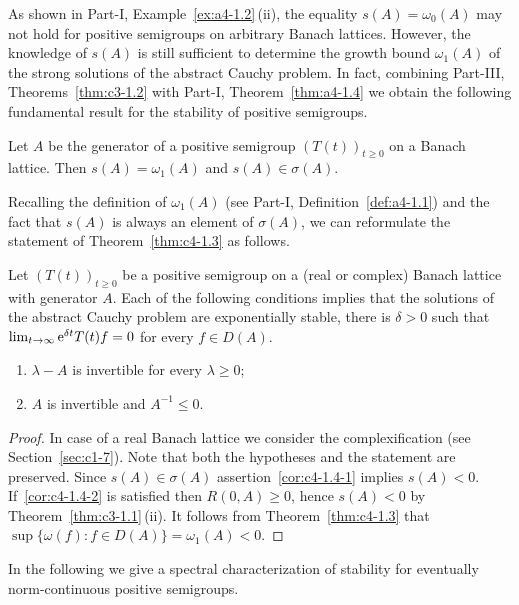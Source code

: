 As shown in Part-I, Example~\ref{ex:a4-1.2}\,(ii), the equality $s(A) = \omega_{0}(A)$ may not hold for positive semigroups on arbitrary Banach lattices.
However, the knowledge of\/ $s(A)$ is still sufficient to determine the growth bound $\omega_{1}(A)$ of the strong solutions of the abstract Cauchy problem.
In fact, combining 
Part-III, Theorems~\ref{thm:c3-1.2}  with 
Part-I, Theorem~\ref{thm:a4-1.4} 
we obtain the following fundamental result for the stability of positive semigroups.
\begin{theorem}\label{thm:c4-1.3}
Let $A$ be the generator of a positive semigroup $(T(t))_{t\geq 0}$ on a Banach lattice.
Then $s(A) = \omega_{1}(A)$ and $s(A) \in \sigma(A)$.
\end{theorem}
Recalling the definition of\/ $\omega_{1}(A)$ 
(see Part-I, Definition~\ref{def:a4-1.1}) 
and the fact that $s(A)$ is always an element of\/ $\sigma(A)$, we can reformulate the statement of Theorem~\ref{thm:c4-1.3} as follows.
\begin{corollary}\label{cor:c4-1.4}%
Let $(T(t))_{t\geq 0}$ be a positive semigroup on a (real or complex) Banach lattice with generator $A$.
Each of the following conditions implies that the solutions of the abstract Cauchy problem are exponentially stable, \ie  there is $\delta > 0$ such that $\lim_{t \to \infty} \mathrm{e}^{\delta t}T(t)f = 0$ for every $f \in D(A)$.
\begin{enumerate}[\upshape (i)]
    \item \label{cor:c4-1.4-1}
    $\lambda - A$ is invertible for every $\lambda \geq 0$;
    \item \label{cor:c4-1.4-2}
    $A$ is invertible and $A^{-1} \leq 0$.
    \end{enumerate}
\end{corollary}
\begin{proof}
In case of a real Banach lattice we consider the complexification 
(see Section~\ref{sec:c1-7}).
Note that both the hypotheses and the statement are preserved.
Since $s(A) \in \sigma(A)$ assertion~\ref{cor:c4-1.4-1} implies $s(A) < 0$.
If~\ref{cor:c4-1.4-2} is satisfied then $R(0,A) \geq 0$, hence $s(A) < 0$ by Theorem~\ref{thm:c3-1.1}\,(ii).
It follows from Theorem~\ref{thm:c4-1.3} that $\sup\{\omega(f) \colon f \in D(A)\} = \omega_{1}(A) < 0$.
\end{proof}
In the following we give a spectral characterization of stability for eventually norm-continuous positive semigroups.
